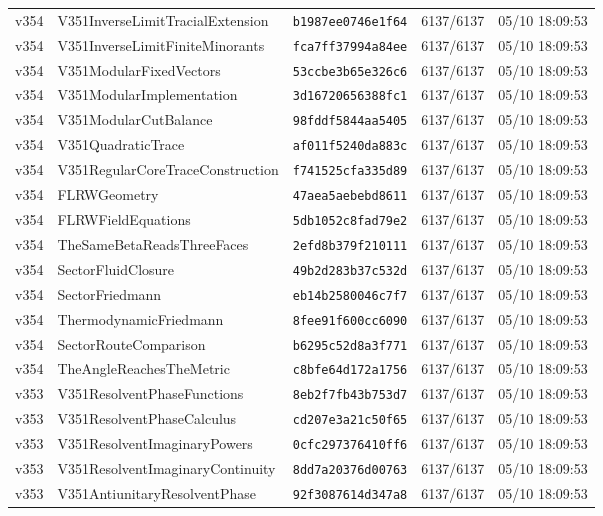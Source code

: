 \documentclass[11pt]{article}
\theoremstyle{definition}\newtheorem{deriv}{Derivação}
\begin{document}
{\begin{longtable}{@{}lllll@{}}
v354 & V351InverseLimitTracialExtension & \texttt{b1987ee0746e1f64} & 6137/6137 & 05/10 18:09:53 \\
v354 & V351InverseLimitFiniteMinorants & \texttt{fca7ff37994a84ee} & 6137/6137 & 05/10 18:09:53 \\
v354 & V351ModularFixedVectors & \texttt{53ccbe3b65e326c6} & 6137/6137 & 05/10 18:09:53 \\
v354 & V351ModularImplementation & \texttt{3d16720656388fc1} & 6137/6137 & 05/10 18:09:53 \\
v354 & V351ModularCutBalance & \texttt{98fddf5844aa5405} & 6137/6137 & 05/10 18:09:53 \\
v354 & V351QuadraticTrace & \texttt{af011f5240da883c} & 6137/6137 & 05/10 18:09:53 \\
v354 & V351RegularCoreTraceConstruction & \texttt{f741525cfa335d89} & 6137/6137 & 05/10 18:09:53 \\
v354 & FLRWGeometry & \texttt{47aea5aebebd8611} & 6137/6137 & 05/10 18:09:53 \\
v354 & FLRWFieldEquations & \texttt{5db1052c8fad79e2} & 6137/6137 & 05/10 18:09:53 \\
v354 & TheSameBetaReadsThreeFaces & \texttt{2efd8b379f210111} & 6137/6137 & 05/10 18:09:53 \\
v354 & SectorFluidClosure & \texttt{49b2d283b37c532d} & 6137/6137 & 05/10 18:09:53 \\
v354 & SectorFriedmann & \texttt{eb14b2580046c7f7} & 6137/6137 & 05/10 18:09:53 \\
v354 & ThermodynamicFriedmann & \texttt{8fee91f600cc6090} & 6137/6137 & 05/10 18:09:53 \\
v354 & SectorRouteComparison & \texttt{b6295c52d8a3f771} & 6137/6137 & 05/10 18:09:53 \\
v354 & TheAngleReachesTheMetric & \texttt{c8bfe64d172a1756} & 6137/6137 & 05/10 18:09:53 \\
v353 & V351ResolventPhaseFunctions & \texttt{8eb2f7fb43b753d7} & 6137/6137 & 05/10 18:09:53 \\
v353 & V351ResolventPhaseCalculus & \texttt{cd207e3a21c50f65} & 6137/6137 & 05/10 18:09:53 \\
v353 & V351ResolventImaginaryPowers & \texttt{0cfc297376410ff6} & 6137/6137 & 05/10 18:09:53 \\
v353 & V351ResolventImaginaryContinuity & \texttt{8dd7a20376d00763} & 6137/6137 & 05/10 18:09:53 \\
v353 & V351AntiunitaryResolventPhase & \texttt{92f3087614d347a8} & 6137/6137 & 05/10 18:09:53 \\

\end{longtable}}
\end{document}
